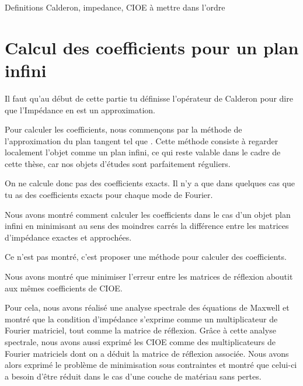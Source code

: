 \begin{REM}
  Definitions Calderon, impedance, CIOE à mettre dans l'ordre
\end{REM}

\chapter{Calcul des coefficients pour un plan infini}
\label{sec:plan}
\minitoc
\newpage
\begin{REM}
  Il faut qu'au début de cette partie tu définisse l’opérateur de Calderon pour dire que l’Impédance en est un approximation.
\end{REM}
Pour calculer les coefficients, nous commençons par la méthode de l'approximation du plan tangent tel que \cite{hoppe_impedance_1995,marceaux_high-order_2000,aubakirov_electromagnetic_2014}. Cette méthode consiste à regarder localement l'objet comme un plan infini, ce qui reste valable dans le cadre de cette thèse, car nos objets d'études sont parfaitement réguliers.
\begin{REM}
  On ne calcule donc pas des coefficients exacts. Il n'y a que dans quelques cas que tu as des coefficients exacts pour chaque mode de Fourier.
\end{REM}







Nous avons montré comment calculer les coefficients dans le cas d'un objet plan infini en minimisant au sens des moindres carrés la différence entre les matrices d'impédance exactes et approchées.
\begin{REM}
    Ce n'est pas montré, c'est proposer une méthode pour calculer des coefficients.
\end{REM}
Nous avons montré que minimiser l'erreur entre les matrices de réflexion aboutit aux mêmes coefficients de CIOE.

Pour cela, nous avons réalisé une analyse spectrale des équations de Maxwell et montré que la condition d'impédance s'exprime comme un multiplicateur de Fourier matriciel, tout comme la matrice de réflexion. Grâce à cette analyse spectrale, nous avons aussi exprimé les CIOE comme des multiplicateurs de Fourier matriciels dont on a déduit la matrice de réflexion associée. Nous avons alors exprimé le problème de minimisation sous contraintes et montré que celui-ci a besoin d'être réduit dans le cas d'une couche de matériau sans pertes.

